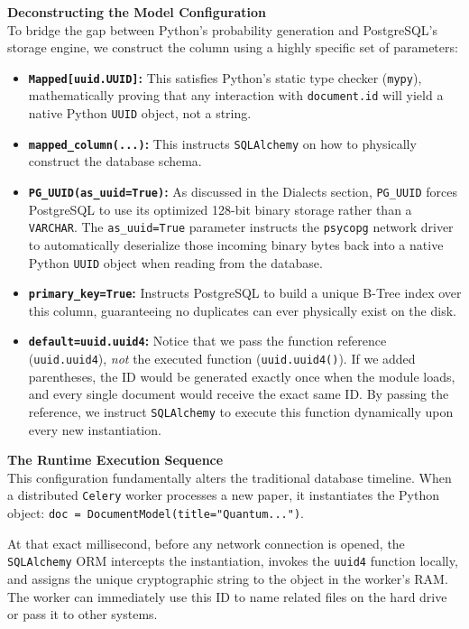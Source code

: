 \textbf{Deconstructing the Model Configuration} \\
To bridge the gap between Python's probability generation and PostgreSQL's storage engine, we construct the column using a highly specific set of parameters:
\begin{itemize}
    \item \textbf{\texttt{Mapped[uuid.UUID]}:} This satisfies Python's static type checker (\texttt{mypy}), mathematically proving that any interaction with \texttt{document.id} will yield a native Python \texttt{UUID} object, not a string.
    \item \textbf{\texttt{mapped\_column(...)}:} This instructs \texttt{SQLAlchemy} on how to physically construct the database schema.
    \item \textbf{\texttt{PG\_UUID(as\_uuid=True)}:} As discussed in the Dialects section, \texttt{PG\_UUID} forces PostgreSQL to use its optimized 128-bit binary storage rather than a \texttt{VARCHAR}. The \texttt{as\_uuid=True} parameter instructs the \texttt{psycopg} network driver to automatically deserialize those incoming binary bytes back into a native Python \texttt{UUID} object when reading from the database.
    \item \textbf{\texttt{primary\_key=True}:} Instructs PostgreSQL to build a unique B-Tree index over this column, guaranteeing no duplicates can ever physically exist on the disk.
    \item \textbf{\texttt{default=uuid.uuid4}:} Notice that we pass the function reference (\texttt{uuid.uuid4}), \textit{not} the executed function (\texttt{uuid.uuid4()}). If we added parentheses, the ID would be generated exactly once when the module loads, and every single document would receive the exact same ID. By passing the reference, we instruct \texttt{SQLAlchemy} to execute this function dynamically upon every new instantiation.
\end{itemize}

\textbf{The Runtime Execution Sequence} \\
This configuration fundamentally alters the traditional database timeline. When a distributed \texttt{Celery} worker processes a new paper, it instantiates the Python object: \texttt{doc = DocumentModel(title="Quantum...")}.

At that exact millisecond, before any network connection is opened, the \texttt{SQLAlchemy} ORM intercepts the instantiation, invokes the \texttt{uuid4} function locally, and assigns the unique cryptographic string to the object in the worker's RAM. The worker can immediately use this ID to name related files on the hard drive or pass it to other systems.

